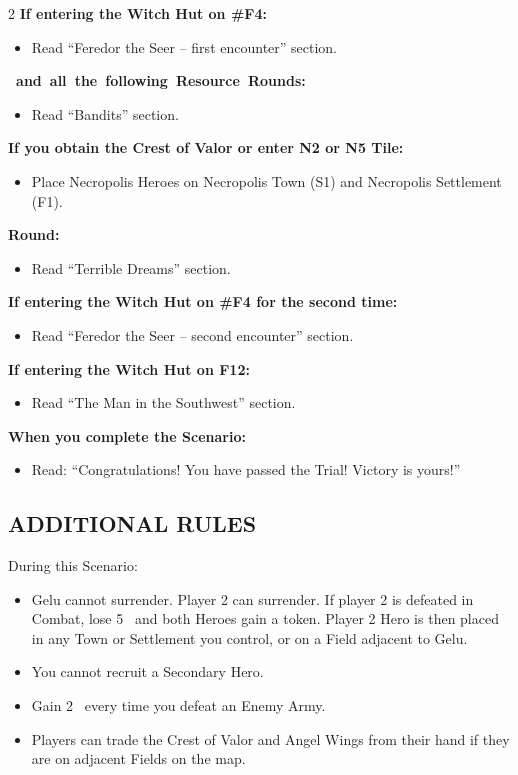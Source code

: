 \begin{multicols*}{2}
\textbf{If entering the Witch Hut on \#F4:}
\begin{itemize}
  \item Read ``Feredor the Seer -- first encounter'' section.
\end{itemize}

\textbf{\mbox{ and all the following Resource Rounds:}}
\begin{itemize}
  \item Read ``Bandits'' section.
\end{itemize}

\textbf{If you obtain the Crest of Valor or enter N2 or N5 Tile:}
\begin{itemize}
  \item Place Necropolis Heroes on Necropolis Town (S1) and Necropolis Settlement (F1).
\end{itemize}

\columnbreak
\textbf{ Round:}
\begin{itemize}
  \item Read ``Terrible Dreams'' section.
\end{itemize}

\textbf{If entering the Witch Hut on \#F4 for the second time:}
\begin{itemize}
  \item Read ``Feredor the Seer -- second encounter'' section.
\end{itemize}

\textbf{If entering the Witch Hut on F12:}
\begin{itemize}
  \item Read ``The Man in the Southwest'' section.
\end{itemize}

\textbf{When you complete the Scenario:}
\begin{itemize}
  \item Read: ``Congratulations! You have passed the Trial! Victory is yours!''
\end{itemize}

\subsection*{\MakeUppercase{Additional Rules}}

During this Scenario:

\begin{itemize}
  \item Gelu cannot surrender.
    Player 2 can surrender.
    If player 2 is defeated in Combat, lose 5~ and both Heroes gain a  token.
    Player 2 Hero is then placed in any Town or Settlement you control, or on a Field adjacent to Gelu.
  \item You cannot recruit a Secondary Hero.
  \item Gain 2~ every time you defeat an Enemy Army.
  \item Players can trade the Crest of Valor and Angel Wings from their hand if they are on adjacent Fields on the map.
\end{itemize}


\end{multicols*}
